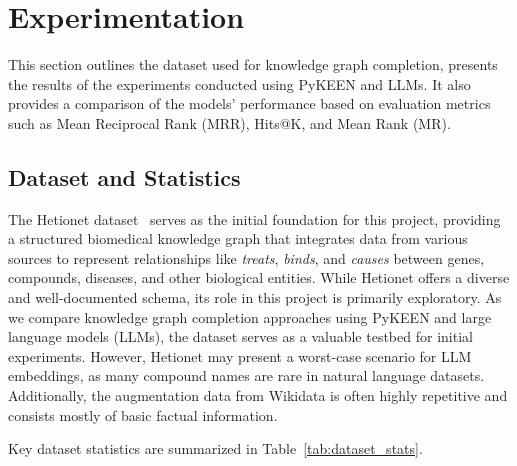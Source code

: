 \section*{Experimentation}


This section outlines the dataset used for knowledge graph completion, presents the results of the experiments conducted using PyKEEN and LLMs.
It also provides a comparison of the models' performance based on evaluation metrics such as Mean Reciprocal Rank (MRR), Hits@K, and Mean Rank (MR).

\subsection*{Dataset and Statistics}


The Hetionet dataset~\cite{hetionet} serves as the initial foundation for this project, providing a structured biomedical knowledge graph
that integrates data from various sources to represent relationships like \textit{treats}, \textit{binds}, and \textit{causes} between genes,
compounds, diseases, and other biological entities.
While Hetionet offers a diverse and well-documented schema, its role in this project is primarily exploratory.
As we compare knowledge graph completion approaches using PyKEEN and large language models (LLMs), the dataset serves as a valuable testbed for initial experiments.
However, Hetionet may present a worst-case scenario for LLM embeddings, as many compound names are rare in natural language datasets.
Additionally, the augmentation data from Wikidata is often highly repetitive and consists mostly of basic factual information.

Key dataset statistics are summarized in Table~\ref{tab:dataset_stats}.

